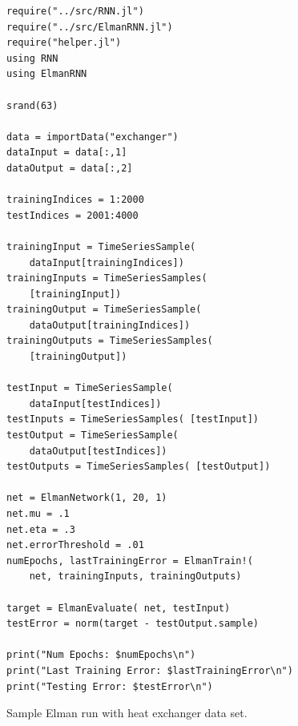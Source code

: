 \documentclass{acm_proc_article-sp}
\begin{document}
\begin{listing}
\begin{snugshade}
\begin{verbatim}
require("../src/RNN.jl")
require("../src/ElmanRNN.jl")
require("helper.jl")
using RNN
using ElmanRNN

srand(63)

data = importData("exchanger")
dataInput = data[:,1]
dataOutput = data[:,2]

trainingIndices = 1:2000
testIndices = 2001:4000

trainingInput = TimeSeriesSample( 
    dataInput[trainingIndices])
trainingInputs = TimeSeriesSamples( 
    [trainingInput])
trainingOutput = TimeSeriesSample( 
    dataOutput[trainingIndices])
trainingOutputs = TimeSeriesSamples( 
    [trainingOutput])

testInput = TimeSeriesSample( 
    dataInput[testIndices])
testInputs = TimeSeriesSamples( [testInput])
testOutput = TimeSeriesSample( 
    dataOutput[testIndices])
testOutputs = TimeSeriesSamples( [testOutput])

net = ElmanNetwork(1, 20, 1)
net.mu = .1
net.eta = .3
net.errorThreshold = .01
numEpochs, lastTrainingError = ElmanTrain!(
    net, trainingInputs, trainingOutputs)

target = ElmanEvaluate( net, testInput)
testError = norm(target - testOutput.sample)

print("Num Epochs: $numEpochs\n")
print("Last Training Error: $lastTrainingError\n")
print("Testing Error: $testError\n")
\end{verbatim}
\end{snugshade}
\caption{Sample Elman run with heat exchanger data set.}
\label{code:exchangerElman}
\end{listing}
\end{document}
